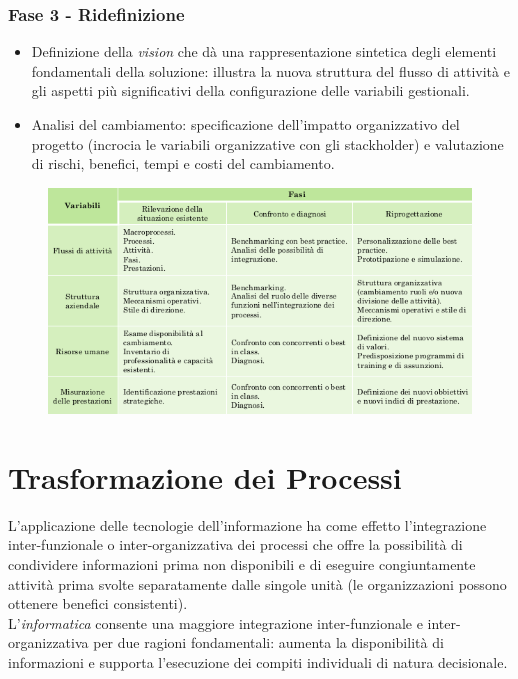 \documentclass[a4paper, notitlepage, 9pt]{extreport}
\begin{document}
\subsubsection*{Fase 3 - Ridefinizione}
\begin{multicols}{2}
\begin{itemize}
	\item Definizione della \textit{vision} che dà una rappresentazione sintetica degli elementi fondamentali della soluzione: illustra la nuova struttura del flusso di attività e gli aspetti più significativi della configurazione delle variabili gestionali.
	\item Analisi del cambiamento: specificazione dell’impatto organizzativo del progetto (incrocia le variabili organizzative con gli stackholder) e valutazione di rischi, benefici, tempi e costi del cambiamento.
\end{itemize}
\columnbreak
\begin{figure}[H]
	\centering
	\includegraphics[scale=0.3]{Griglia}
\end{figure}
\end{multicols}

\section*{Trasformazione dei Processi}
L’applicazione delle tecnologie dell’informazione ha come effetto l’integrazione inter-funzionale o inter-organizzativa dei processi che offre la possibilità di condividere informazioni prima non disponibili e di eseguire congiuntamente attività prima svolte separatamente dalle singole unità (le organizzazioni possono ottenere benefici consistenti).\\
L’\textit{informatica} consente una maggiore integrazione inter-funzionale e inter-organizzativa per due ragioni fondamentali: aumenta la disponibilità di informazioni e supporta l’esecuzione dei compiti individuali di natura decisionale.
\end{document}
